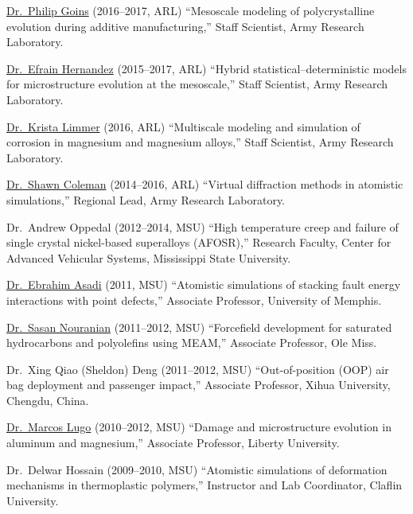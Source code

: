 \begin{list2}
\vspace*{.05in}
\item
\href{https://www.linkedin.com/in/philip-goins-89982636}{Dr.~Philip Goins} (2016--2017, ARL) ``Mesoscale modeling of polycrystalline evolution during additive manufacturing,'' Staff Scientist, Army Research Laboratory.
\item
\href{https://www.researchgate.net/profile/Efrain_Hernandez-Rivera}{Dr.~Efrain Hernandez} (2015--2017, ARL) ``Hybrid statistical--deterministic models for microstructure evolution at the mesoscale,'' Staff Scientist, Army Research Laboratory.
\item
\href{https://www.researchgate.net/profile/Krista_Limmer}{Dr.~Krista Limmer} (2016, ARL) ``Multiscale modeling and simulation of corrosion in magnesium and magnesium alloys,'' Staff Scientist, Army Research Laboratory.
\item
\href{http://scholar.google.com/citations?user=Ueq2NM4AAAAJ&hl=en}{Dr.~Shawn Coleman} (2014--2016, ARL) ``Virtual diffraction methods in atomistic simulations,'' Regional Lead, Army Research Laboratory.
\item
Dr.~Andrew Oppedal (2012--2014, MSU) ``High temperature creep and failure of single crystal nickel-based superalloys (AFOSR),'' Research Faculty, Center for Advanced Vehicular Systems, Mississippi State University.
\item
\href{http://scholar.google.com/citations?user=f9_ceZEAAAAJ&hl=en}{Dr.~Ebrahim Asadi} (2011, MSU) ``Atomistic simulations of stacking fault energy interactions with point defects,'' Associate Professor, University of Memphis.
\item
\href{http://scholar.google.com/citations?user=b0N71IgAAAAJ&hl=en}{Dr.~Sasan Nouranian} (2011--2012, MSU) ``Forcefield development for saturated hydrocarbons and polyolefins using MEAM,'' Associate Professor, Ole Miss.
\item
Dr.~Xing Qiao (Sheldon) Deng (2011--2012, MSU) ``Out-of-position (OOP) air bag deployment and passenger impact,'' Associate Professor, Xihua University, Chengdu, China.
\item
\href{http://scholar.google.com/citations?user=lpxuxN8AAAAJ&hl=en}{Dr.~Marcos Lugo} (2010--2012, MSU) ``Damage and microstructure evolution in aluminum and magnesium,'' Associate Professor, Liberty University.
\item
Dr.~Delwar Hossain (2009--2010, MSU) ``Atomistic simulations of deformation mechanisms in thermoplastic polymers,'' Instructor and Lab Coordinator, Claflin University.
\end{list2}

